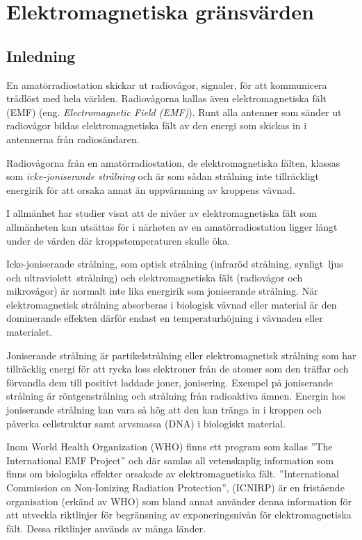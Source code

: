\chapter[EMF gränsvärden]{Elektromagnetiska gränsvärden}
\label{EMF}

\section{Inledning}
En amatörradiostation skickar ut radiovågor, signaler, för att kommunicera
trådlöst med hela världen.
Radiovågorna kallas även elektromagnetiska fält (EMF) 
(eng. \emph{Electromagnetic Field (EMF)}).
Runt alla antenner som sänder ut radiovågor bildas elektromagnetiska fält av den
energi som skickas in i antennerna från radiosändaren.

Radiovågorna från en amatörradiostation, de elektromagnetiska fälten, klassas
som \emph{icke-joniserande strålning} och är som sådan strålning inte
tillräckligt energirik för att orsaka annat än uppvärmning av kroppens vävnad.

I allmänhet har studier visat att de nivåer av elektromagnetiska fält som
allmänheten kan utsättas för i närheten av en amatörradiostation ligger långt
under de värden där kroppstemperaturen skulle öka.

Icke-joniserande strålning, som optisk strålning (infraröd strålning,
synligt~ljus och ultraviolett~strålning) och elektromagnetiska fält (radiovågor
och mikrovågor) är normalt inte lika energirik som joniserande strålning.
När elektromagnetisk strålning absorberas i biologisk vävnad eller material är
den dominerande effekten därför endast en temperaturhöjning i vävnaden eller
materialet.

Joniserande strålning är partikelstrålning eller elektromagnetisk strålning som
har tillräcklig energi för att rycka loss elektroner från de atomer som den
träffar och förvandla dem till positivt laddade joner, jonisering.
Exempel på joniserande strålning är röntgenstrålning och strålning från
radioaktiva ämnen.
Energin hos joniserande strålning kan vara så hög att den kan tränga in i
kroppen och påverka cellstruktur samt arvsmassa (DNA) i biologiskt material.

Inom World Health Organization (WHO) finns ett program som kallas
''The International EMF Project'' och där samlas all vetenskaplig
information som finns om biologiska effekter orsakade av elektromagnetiska fält.
''International Commission on Non-Ionizing Radiation Protection'', (ICNIRP)
är en fristående organisation (erkänd av WHO) som bland annat använder denna
information för att utveckla riktlinjer för begränsning av exponeringsnivån för
elektromagnetiska fält.
Dessa riktlinjer används av många länder.

